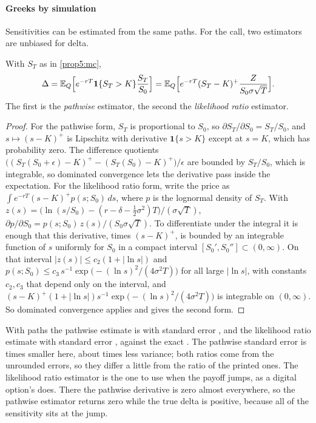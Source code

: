 \begin{chapterrefs}
\paragraph{Greeks by simulation}
Sensitivities can be estimated from the same paths. For the call, two estimators are unbiased for
delta.

\begin{proposition}\label{prop5:pathwise}
With $S_T$ as in \cref{prop5:mc},
\begin{equation*}
  \Delta=\mathbb{E}_Q\Bigl[e^{-rT}\mathbf 1\{S_T>K\}\frac{S_T}{S_0}\Bigr]
  =\mathbb{E}_Q\Bigl[e^{-rT}(S_T-K)^+\frac{Z}{S_0\sigma\sqrt T}\Bigr].
\end{equation*}
The first is the \emph{pathwise} estimator, the second the \emph{likelihood ratio} estimator.
\end{proposition}

\begin{proof}
For the pathwise form, $S_T$ is proportional to $S_0$, so $\partial S_T/\partial S_0=S_T/S_0$, and
$s\mapsto(s-K)^+$ is Lipschitz with derivative $\mathbf 1\{s>K\}$ except at $s=K$, which has
probability zero. The difference quotients $\bigl((S_T(S_0+\epsilon)-K)^+-(S_T(S_0)-K)^+\bigr)/\epsilon$ are bounded
by $S_T/S_0$, which is integrable, so dominated convergence lets the derivative pass inside the
expectation. For the likelihood ratio form, write the price as $\int e^{-rT}(s-K)^+p(s;S_0)\,ds$, where
$p$ is the lognormal density of $S_T$. With $z(s)=\bigl(\ln(s/S_0)-(r-\delta-\tfrac12\sigma^2)T\bigr)/(\sigma\sqrt T)$,
$\partial p/\partial S_0=p(s;S_0)\,z(s)/(S_0\sigma\sqrt T)$. To differentiate under the integral it is
enough that this derivative, times $(s-K)^+$, is bounded by an integrable function of $s$ uniformly
for $S_0$ in a compact interval $[S_0',S_0'']\subset(0,\infty)$. On that interval
$|z(s)|\le c_2(1+|\ln s|)$ and $p(s;S_0)\le c_3\,s^{-1}\exp\bigl(-(\ln s)^2/(4\sigma^2T)\bigr)$ for all
large $|\ln s|$, with constants $c_2,c_3$ that depend only on the interval, and
$(s-K)^+(1+|\ln s|)s^{-1}\exp\bigl(-(\ln s)^2/(4\sigma^2T)\bigr)$ is integrable on $(0,\infty)$. So
dominated convergence applies and gives the second form.
\end{proof}

With \deltaPaths{} paths the pathwise estimate is \deltaPW{} with standard error \deltaPWSE, and the
likelihood ratio estimate \deltaLR{} with standard error \deltaLRSE, against the exact \deltaC. The
pathwise standard error is \deltaSERatio{} times smaller here, about \deltaVarRatio{} times less variance;
both ratios come from the unrounded errors, so they differ a little from the ratio of the printed ones.
The likelihood ratio estimator is the one to use when the payoff jumps, as a digital option's does.
There the pathwise derivative is zero almost everywhere, so the pathwise estimator returns zero while
the true delta is positive, because all of the sensitivity sits at the jump.


\end{chapterrefs}
